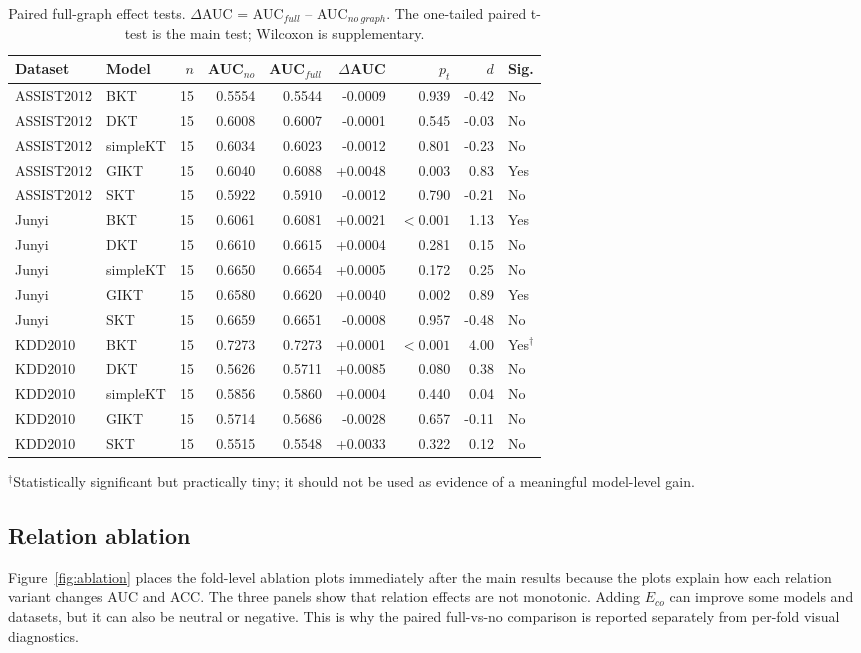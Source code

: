 \documentclass[11pt,a4paper]{article}
\newcommand{\Eco}{$E_{co}$}
\begin{document}
\begin{table}[H]
\centering
\caption{Paired full-graph effect tests. $\Delta$AUC = AUC$_{full}$ -- AUC$_{no\ graph}$. The one-tailed paired t-test is the main test; Wilcoxon is supplementary.}
\label{tab:paired}
\scriptsize
\begin{tabular}{llrrrrrrl}
\toprule
Dataset & Model & $n$ & AUC$_{no}$ & AUC$_{full}$ & $\Delta$AUC & $p_t$ & $d$ & Sig. \\
\midrule
ASSIST2012 & BKT & 15 & 0.5554 & 0.5544 & -0.0009 & 0.939 & -0.42 & No \\
ASSIST2012 & DKT & 15 & 0.6008 & 0.6007 & -0.0001 & 0.545 & -0.03 & No \\
ASSIST2012 & simpleKT & 15 & 0.6034 & 0.6023 & -0.0012 & 0.801 & -0.23 & No \\
ASSIST2012 & GIKT & 15 & 0.6040 & 0.6088 & +0.0048 & 0.003 & 0.83 & Yes \\
ASSIST2012 & SKT & 15 & 0.5922 & 0.5910 & -0.0012 & 0.790 & -0.21 & No \\
Junyi & BKT & 15 & 0.6061 & 0.6081 & +0.0021 & $<0.001$ & 1.13 & Yes \\
Junyi & DKT & 15 & 0.6610 & 0.6615 & +0.0004 & 0.281 & 0.15 & No \\
Junyi & simpleKT & 15 & 0.6650 & 0.6654 & +0.0005 & 0.172 & 0.25 & No \\
Junyi & GIKT & 15 & 0.6580 & 0.6620 & +0.0040 & 0.002 & 0.89 & Yes \\
Junyi & SKT & 15 & 0.6659 & 0.6651 & -0.0008 & 0.957 & -0.48 & No \\
KDD2010 & BKT & 15 & 0.7273 & 0.7273 & +0.0001 & $<0.001$ & 4.00 & Yes$^{\dagger}$ \\
KDD2010 & DKT & 15 & 0.5626 & 0.5711 & +0.0085 & 0.080 & 0.38 & No \\
KDD2010 & simpleKT & 15 & 0.5856 & 0.5860 & +0.0004 & 0.440 & 0.04 & No \\
KDD2010 & GIKT & 15 & 0.5714 & 0.5686 & -0.0028 & 0.657 & -0.11 & No \\
KDD2010 & SKT & 15 & 0.5515 & 0.5548 & +0.0033 & 0.322 & 0.12 & No \\
\bottomrule
\end{tabular}
\begin{flushleft}\scriptsize $^{\dagger}$Statistically significant but practically tiny; it should not be used as evidence of a meaningful model-level gain.\end{flushleft}
\end{table}

\subsection{Relation ablation}
Figure~\ref{fig:ablation} places the fold-level ablation plots immediately after the main results because the plots explain how each relation variant changes AUC and ACC. The three panels show that relation effects are not monotonic. Adding \Eco{} can improve some models and datasets, but it can also be neutral or negative. This is why the paired full-vs-no comparison is reported separately from per-fold visual diagnostics.
\end{document}

